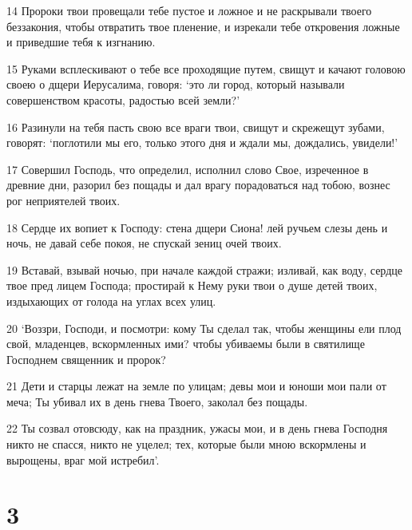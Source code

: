 \par 14 Пророки твои провещали тебе пустое и ложное и не раскрывали твоего беззакония, чтобы отвратить твое пленение, и изрекали тебе откровения ложные и приведшие тебя к изгнанию.
\par 15 Руками всплескивают о тебе все проходящие путем, свищут и качают головою своею о дщери Иерусалима, говоря: `это ли город, который называли совершенством красоты, радостью всей земли?'
\par 16 Разинули на тебя пасть свою все враги твои, свищут и скрежещут зубами, говорят: `поглотили мы его, только этого дня и ждали мы, дождались, увидели!'
\par 17 Совершил Господь, что определил, исполнил слово Свое, изреченное в древние дни, разорил без пощады и дал врагу порадоваться над тобою, вознес рог неприятелей твоих.
\par 18 Сердце их вопиет к Господу: стена дщери Сиона! лей ручьем слезы день и ночь, не давай себе покоя, не спускай зениц очей твоих.
\par 19 Вставай, взывай ночью, при начале каждой стражи; изливай, как воду, сердце твое пред лицем Господа; простирай к Нему руки твои о душе детей твоих, издыхающих от голода на углах всех улиц.
\par 20 `Воззри, Господи, и посмотри: кому Ты сделал так, чтобы женщины ели плод свой, младенцев, вскормленных ими? чтобы убиваемы были в святилище Господнем священник и пророк?
\par 21 Дети и старцы лежат на земле по улицам; девы мои и юноши мои пали от меча; Ты убивал их в день гнева Твоего, заколал без пощады.
\par 22 Ты созвал отовсюду, как на праздник, ужасы мои, и в день гнева Господня никто не спасся, никто не уцелел; тех, которые были мною вскормлены и вырощены, враг мой истребил'.

\chapter{3}

